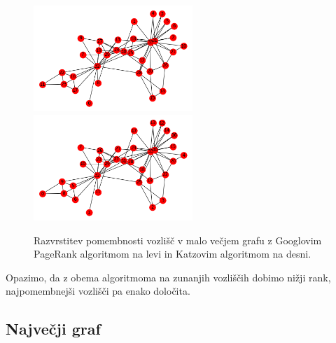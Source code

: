\documentclass[a4paper]{article}
\begin{document}
\begin{figure}[h]
\begin{center} 
\includegraphics[width=6cm]{O_graph1.png}
\includegraphics[width=6cm]{O_graph2.png}
\caption[Razvrstitev pomembnosti vozlišč v malo večjem grafu]{Razvrstitev pomembnosti vozlišč v malo večjem grafu z Googlovim PageRank algoritmom na levi in Katzovim algoritmom na desni.}
\end{center}
\end{figure}

Opazimo, da z obema algoritmoma na zunanjih vozliščih dobimo nižji rank, najpomembnejši vozlišči pa enako določita.

\subsection{Največji graf}
\end{document}
